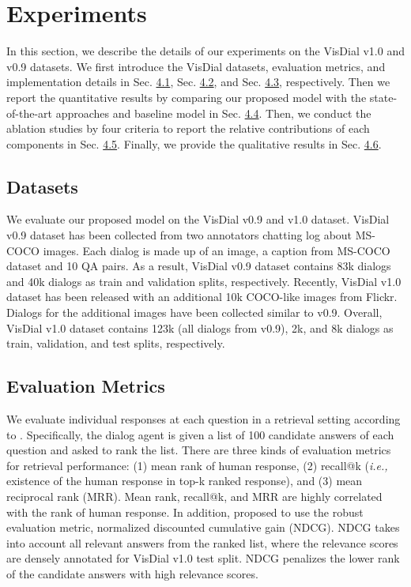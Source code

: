 \documentclass[11pt,a4paper]{article}
\begin{document}
\section{Experiments}
In this section, we describe the details of our experiments on the VisDial v1.0 and v0.9 datasets. We first introduce the VisDial datasets, evaluation metrics, and implementation details in Sec. \hyperref[sec:dset]{4.1}, Sec. \hyperref[sec:eval]{4.2}, and Sec. \hyperref[sec:impdet]{4.3}, respectively. Then we report the quantitative results by comparing our proposed model with the state-of-the-art approaches and baseline model in Sec. \hyperref[sec:quan]{4.4}. Then, we conduct the ablation studies by four criteria to report the relative contributions of each components in Sec. \hyperref[sec:abl]{4.5}. Finally, we provide the qualitative results in Sec. \hyperref[sec:qual]{4.6}.

\subsection{Datasets}
\label{sec:dset}
We evaluate our proposed model on the VisDial v0.9 and v1.0 dataset. VisDial v0.9 dataset \cite{das2017visual} has been collected from two annotators chatting log about MS-COCO \cite{lin2014microsoft} images. Each dialog is made up of an image, a caption from MS-COCO dataset and 10 QA pairs. As a result, VisDial v0.9 dataset contains 83k dialogs and 40k dialogs as train and validation splits, respectively. Recently, VisDial v1.0 dataset \cite{das2017visual} has been released with an additional 10k COCO-like images from Flickr. Dialogs for the additional images have been collected similar to v0.9. Overall, VisDial v1.0 dataset contains 123k (all dialogs from v0.9), 2k, and 8k dialogs as train, validation, and test splits, respectively.

\subsection{Evaluation Metrics}
\label{sec:eval}
We evaluate individual responses at each question in a retrieval setting according to \cite{das2017visual}. Specifically, the dialog agent is given a list of 100 candidate answers of each question and asked to rank the list. There are three kinds of evaluation metrics for retrieval performance: (1) mean rank of human response, (2) recall@k ({\it i.e.,} existence of the human response in top-k ranked response), and (3) mean reciprocal rank (MRR). Mean rank, recall@k, and MRR are highly correlated with the rank of human response. In addition, \cite{das2017visual} proposed to use the robust evaluation metric, normalized discounted cumulative gain (NDCG). NDCG takes into account all relevant answers from the ranked list, where the relevance scores are densely annotated for VisDial v1.0 test split. NDCG penalizes the lower rank of the candidate answers with high relevance scores.
\end{document}
